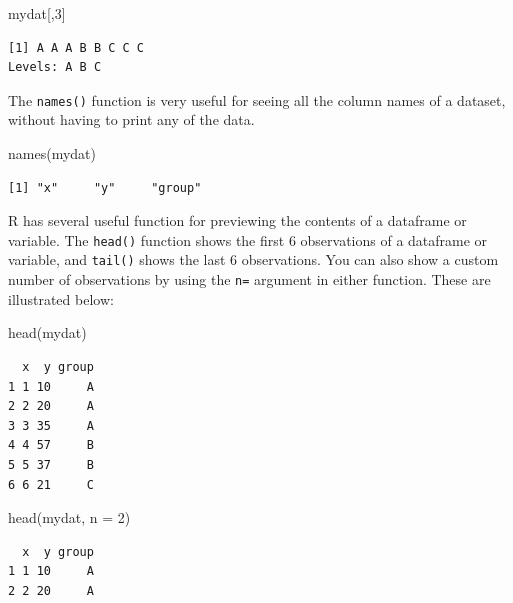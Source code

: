 \documentclass[
  letterpaper,
  DIV=11,
  numbers=noendperiod]{scrreprt}
\newenvironment{Shaded}{\begin{snugshade}}{\end{snugshade}}
\newcommand{\AttributeTok}[1]{\textcolor[rgb]{0.40,0.45,0.13}{#1}}
\newcommand{\DecValTok}[1]{\textcolor[rgb]{0.68,0.00,0.00}{#1}}
\newcommand{\FunctionTok}[1]{\textcolor[rgb]{0.28,0.35,0.67}{#1}}
\newcommand{\NormalTok}[1]{\textcolor[rgb]{0.00,0.23,0.31}{#1}}
\begin{document}
\begin{Shaded}
\begin{Highlighting}[]
\NormalTok{mydat[,}\DecValTok{3}\NormalTok{]}
\end{Highlighting}
\end{Shaded}

\begin{verbatim}
[1] A A A B B C C C
Levels: A B C
\end{verbatim}

The \texttt{names()} function is very useful for seeing all the column
names of a dataset, without having to print any of the data.

\begin{Shaded}
\begin{Highlighting}[]
\FunctionTok{names}\NormalTok{(mydat)}
\end{Highlighting}
\end{Shaded}

\begin{verbatim}
[1] "x"     "y"     "group"
\end{verbatim}

R has several useful function for previewing the contents of a dataframe
or variable. The \texttt{head()} function shows the first 6 observations
of a dataframe or variable, and \texttt{tail()} shows the last 6
observations. You can also show a custom number of observations by using
the \texttt{n=} argument in either function. These are illustrated
below:

\begin{Shaded}
\begin{Highlighting}[]
\FunctionTok{head}\NormalTok{(mydat)}
\end{Highlighting}
\end{Shaded}

\begin{verbatim}
  x  y group
1 1 10     A
2 2 20     A
3 3 35     A
4 4 57     B
5 5 37     B
6 6 21     C
\end{verbatim}

\begin{Shaded}
\begin{Highlighting}[]
\FunctionTok{head}\NormalTok{(mydat, }\AttributeTok{n =} \DecValTok{2}\NormalTok{)}
\end{Highlighting}
\end{Shaded}

\begin{verbatim}
  x  y group
1 1 10     A
2 2 20     A
\end{verbatim}
\end{document}
